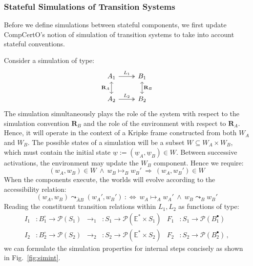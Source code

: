 \documentclass[acmsmall,screen,review,anonymous]{acmart}
\newcommand{\que}{\circ}
\newcommand{\ans}{\bullet}
\newcommand{\intl}[1]{\underline{#1}}
\begin{document}

\subsubsection{Stateful Simulations of Transition Systems} %

Before we define simulations between stateful components,
we first update CompCertO's notion of simulation of transition systems
to take into account stateful conventions.

Consider a simulation of type:
\[
\begin{tikzcd}
  A_1 \ar[r, twoheadrightarrow, "L_1"] \ar[d, leftrightarrow, "\mathbf{R}_A"'] &
  B_1 \ar[d, leftrightarrow, "\mathbf{R}_B"] \\
  A_2 \ar[r, twoheadrightarrow, "L_2"] & B_2
\end{tikzcd}
\]
The simulation simultaneously
plays the role of the system with respect to
the simulation convention $\mathbf{R}_B$ and
the role of the environment with respect to $\mathbf{R}_A$.
Hence,
it will operate in the context of a Kripke frame
constructed from both $W_A$ and $W_B$.
The possible states of a simulation will be a subset
$W \subseteq W_A \times W_B$,
which must contain
the initial state $\intl{w} := (\intl{w}_A, \intl{w}_B) \in W$.
Between successive activations,
the environment may update the $W_B$ component.
Hence we require:
\[
  (w_A, w_B) \in W \:\wedge\:
  w_B \mapsto_B w_B' \:\Rightarrow\:
  (w_A, w_B') \in W
\]
When the components execute,
the worlds will evolve according to
the accessibility relation:
\[
  (w_A, w_B) \leadsto_{\bar{A}B} (w_A', w_B') \::\Leftrightarrow\:
  w_A \mapsto_A w_A' \:\wedge\: w_B \leadsto_B w_B'
\]
Reading the constituent transition relations
within $L_1, L_2$ as functions of type:
\begin{align*}
  I_1 &: B_1^\que \rightarrow \mathcal{P}(S_1) &
  {\rightarrow_1} &: S_1 \rightarrow \mathcal{P}(\mathbb{E}^* \times S_1) &
  F_1 &: S_1 \rightarrow \mathcal{P}(B_1^\ans)
  \\
  I_2 &: B_2^\que \rightarrow \mathcal{P}(S_2) &
  {\rightarrow_2} &: S_2 \rightarrow \mathcal{P}(\mathbb{E}^* \times S_2) &
  F_2 &: S_2 \rightarrow \mathcal{P}(B_2^\ans)
  \,,
\end{align*}
we can formulate the simulation properties for internal steps
concisely as shown in Fig.~\ref{fig:simint}.
\end{document}
